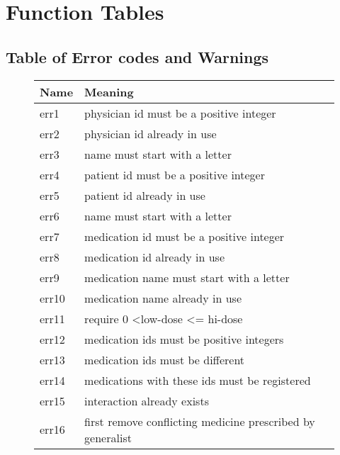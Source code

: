 

\section{Function Tables}

\subsection{Table of Error codes and Warnings}

\begin{figure}[]
\begin{center}
\begin{tabular}{|l|l|}
\hline
Name  & Meaning                                                    \\ \hline
err1  & physician id must be a positive integer                    \\ \hline
err2  & physician id already in use                                \\ \hline
err3  & name must start with a letter                              \\ \hline
err4  & patient id must be a positive integer                      \\ \hline
err5  & patient id already in use                                  \\ \hline
err6  & name must start with a letter                              \\ \hline
err7  & medication id must be a positive integer                   \\ \hline
err8  & medication id already in use                               \\ \hline
err9  & medication name must start with a letter                   \\ \hline
err10 & medication name already in use                             \\ \hline
err11 & require 0 \textless low-dose \textless= hi-dose            \\ \hline
err12 & medication ids must be positive integers                   \\ \hline
err13 & medication ids must be different                           \\ \hline
err14 & medications with these ids must be registered              \\ \hline
err15 & interaction already exists                                 \\ \hline
err16 & first remove conflicting medicine prescribed by generalist \\ \hline

\end{tabular}
\end{center}
\end{figure}
